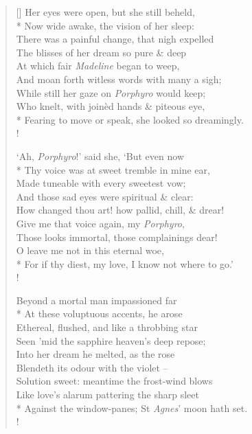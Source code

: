 \documentclass[MAIN]{subfiles}
\begin{document}
\begin{verse}[\versewidth]
\vin Her eyes were open, but she still beheld,\\*
\vin Now wide awake, the vision of her sleep:\\
\vin There was a painful change, that nigh expelled\\
\vin The blisses of her dream so pure \& deep\\
\vin At which fair \emph{Madeline} began to weep,\\
\vin And moan forth witless words with many a sigh;\\
\vin While still her gaze on \emph{Porphyro} would keep;\\
\vin Who knelt, with join\`ed hands \& piteous eye,\\*
Fearing to move or speak, she looked so dreamingly.\\!

\vin `Ah, \emph{Porphyro}!' said she, `But even now\\*
\vin Thy voice was at sweet tremble in mine ear,\\
\vin Made tuneable with every sweetest vow;\\
\vin And those sad eyes were spiritual \& clear:\\
\vin How changed thou art! how pallid, chill, \& drear!\\
\vin Give me that voice again, my \emph{Porphyro},\\
\vin Those looks immortal, those complainings dear!\\
\vin O leave me not in this eternal woe,\\*
For if thy diest, my love, I know not where to go.'\\!

\vin Beyond a mortal man impassioned far\\*
\vin At these voluptuous accents, he arose\\
\vin Ethereal, flushed, and like a throbbing star\\
\vin Seen 'mid the sapphire heaven's deep repose;\\
\vin Into her dream he melted, as the rose\\
\vin Blendeth its odour with the violet --\\
\vin Solution sweet: meantime the frost-wind blows\\
\vin Like love's alarum pattering the sharp sleet\\*
Against the window-panes; St \emph{Agnes}' moon hath set.\\!


\end{verse}
\end{document}
